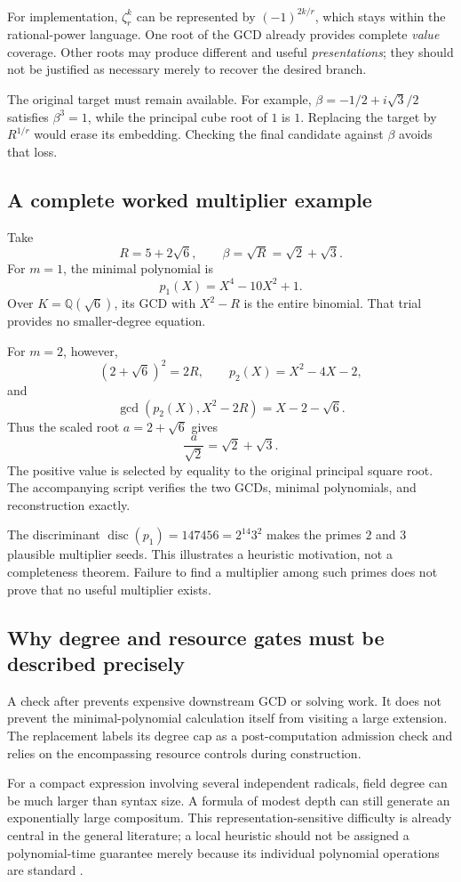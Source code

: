 \documentclass[11pt,letterpaper]{article}
\numberwithin{equation}{section}
\theoremstyle{definition}\newtheorem{definition}[theorem]{Definition}
\theoremstyle{remark}\newtheorem{remark}[theorem]{Remark}
\newcommand{\Q}{\mathbb Q}\newcommand{\C}{\mathbb C}\newcommand{\R}{\mathbb R}\newcommand{\Z}{\mathbb Z}
\newcommand{\code}[1]{\texttt{\detokenize{#1}}}
\begin{document}
For implementation, $\zeta_r^k$ can be represented by $(-1)^{2k/r}$, which stays within the rational-power language. One root of the GCD already provides complete \emph{value} coverage. Other roots may produce different and useful \emph{presentations}; they should not be justified as necessary merely to recover the desired branch.

The original target must remain available. For example, $\beta=-1/2+i\sqrt3/2$ satisfies $\beta^3=1$, while the principal cube root of $1$ is $1$. Replacing the target by $R^{1/r}$ would erase its embedding. Checking the final candidate against $\beta$ avoids that loss.

\subsection{A complete worked multiplier example}
Take
\[
 R=5+2\sqrt6,\qquad \beta=\sqrt R=\sqrt2+\sqrt3.
\]
For $m=1$, the minimal polynomial is
\[
 p_1(X)=X^4-10X^2+1.
\]
Over $K=\Q(\sqrt6)$, its GCD with $X^2-R$ is the entire binomial. That trial provides no smaller-degree equation.

For $m=2$, however,
\[
 (2+\sqrt6)^2=2R,
\qquad p_2(X)=X^2-4X-2,
\]
and
\[
 \gcd(p_2(X),X^2-2R)=X-2-\sqrt6.
\]
Thus the scaled root $a=2+\sqrt6$ gives
\[
 \frac{a}{\sqrt2}=\sqrt2+\sqrt3.
\]
The positive value is selected by equality to the original principal square root. The accompanying script verifies the two GCDs, minimal polynomials, and reconstruction exactly.

The discriminant $\operatorname{disc}(p_1)=147456=2^{14}3^2$ makes the primes $2$ and $3$ plausible multiplier seeds. This illustrates a heuristic motivation, not a completeness theorem. Failure to find a multiplier among such primes does not prove that no useful multiplier exists.

\subsection{Why degree and resource gates must be described precisely}
A \code{MaxDegree} check after \code{MinimalPolynomial} prevents expensive downstream GCD or solving work. It does not prevent the minimal-polynomial calculation itself from visiting a large extension. The replacement labels its degree cap as a post-computation admission check and relies on the encompassing resource controls during construction.

For a compact expression involving several independent radicals, field degree can be much larger than syntax size. A formula of modest depth can still generate an exponentially large compositum. This representation-sensitive difficulty is already central in the general literature; a local heuristic should not be assigned a polynomial-time guarantee merely because its individual polynomial operations are standard \cite{bfht,honsbeek,landau}.
\end{document}
